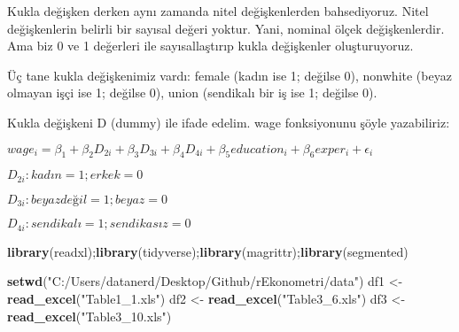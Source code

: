 \documentclass[
]{book}
\newenvironment{Shaded}{\begin{snugshade}}{\end{snugshade}}
\newcommand{\DataTypeTok}[1]{\textcolor[rgb]{0.13,0.29,0.53}{#1}}
\newcommand{\KeywordTok}[1]{\textcolor[rgb]{0.13,0.29,0.53}{\textbf{#1}}}
\newcommand{\NormalTok}[1]{#1}
\newcommand{\OperatorTok}[1]{\textcolor[rgb]{0.81,0.36,0.00}{\textbf{#1}}}
\newcommand{\StringTok}[1]{\textcolor[rgb]{0.31,0.60,0.02}{#1}}
\begin{document}
Kukla değişken derken aynı zamanda nitel değişkenlerden bahsediyoruz. Nitel değişkenlerin belirli bir sayısal değeri yoktur. Yani, nominal ölçek değişkenlerdir. Ama biz 0 ve 1 değerleri ile sayısallaştırıp kukla değişkenler oluşturuyoruz.

Üç tane kukla değişkenimiz vardı: female (kadın ise 1; değilse 0), nonwhite (beyaz olmayan işçi ise 1; değilse 0), union (sendikalı bir iş ise 1; değilse 0).

Kukla değişkeni D (dummy) ile ifade edelim. wage fonksiyonunu şöyle yazabiliriz:

\(wage_i = \beta_1 + \beta_2D_{2i} + \beta_3D_{3i} + \beta_4D_{4i} + \beta_5education_i + \beta_6exper_i + \epsilon_i\)

\(D_{2i}: kadın = 1; erkek = 0\)

\(D_{3i}: beyaz değil = 1; beyaz = 0\)

\(D_{4i}: sendikalı = 1; sendikasız = 0\)

\begin{Shaded}
\begin{Highlighting}[]
\KeywordTok{library}\NormalTok{(readxl);}\KeywordTok{library}\NormalTok{(tidyverse);}\KeywordTok{library}\NormalTok{(magrittr);}\KeywordTok{library}\NormalTok{(segmented)}

\KeywordTok{setwd}\NormalTok{(}\StringTok{"C:/Users/datanerd/Desktop/Github/rEkonometri/data"}\NormalTok{)}
\NormalTok{df1 <-}\StringTok{ }\KeywordTok{read_excel}\NormalTok{(}\StringTok{"Table1_1.xls"}\NormalTok{)}
\NormalTok{df2 <-}\StringTok{ }\KeywordTok{read_excel}\NormalTok{(}\StringTok{"Table3_6.xls"}\NormalTok{)}
\NormalTok{df3 <-}\StringTok{ }\KeywordTok{read_excel}\NormalTok{(}\StringTok{"Table3_10.xls"}\NormalTok{)}
\end{Highlighting}
\end{Shaded}

\begin{Shaded}
\end{Shaded}
\end{document}
